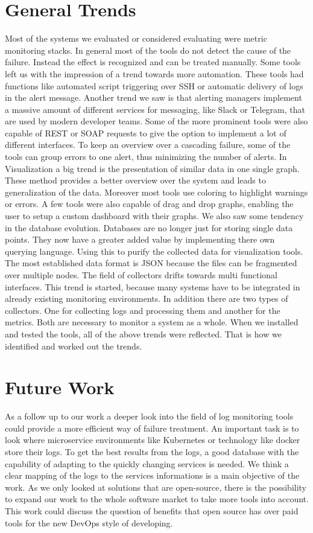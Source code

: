 \section{General Trends}
\label{generaltrends}
Most of the systems we evaluated or considered evaluating were metric monitoring stacks. In general most of the tools do not detect the cause of the failure. Instead the effect is recognized and can be treated manually. Some tools left us with the impression of a trend towards more automation. These tools had functions like automated script triggering over SSH or automatic delivery of logs in the alert message. 
Another trend we saw is that alerting managers implement a massive amount of different services for messaging, like Slack or Telegram, that are used by modern developer teams. Some of the more prominent tools were also capable of REST or SOAP requests to give the option to implement a lot of different interfaces. To keep an overview over a cascading failure, some of the tools can group errors to one alert, thus minimizing the number of alerts.
In Visualization a big trend is the presentation of similar data in one single graph. These method provides a better overview over the system and leads to generalization of the data. Moreover most tools use coloring to highlight warnings or errors. A few tools were also capable of drag and drop graphs, enabling the user to setup a custom dashboard with their graphs.
We also saw some tendency in the database evolution. Databases are no longer just for storing single data points. They now have a greater added value by implementing there own querying language. Using this to purify the collected data for visualization tools. The most established data format is JSON because the files can be fragmented over multiple nodes.
The field of collectors drifts towards multi functional interfaces. This trend is started, because many systems have to be integrated in already existing monitoring environments. In addition there are two types of collectors. One for collecting logs and processing them and another for the metrics. Both are necessary to monitor a system as a whole.
When we installed and tested the tools, all of the above trends were reflected. That is how we identified and worked out the trends. 

\section{Future Work}
\label{futurework}
As a follow up to our work a deeper look into the field of log monitoring tools could provide a more efficient way of failure treatment. An important task is to look where microservice environments like Kubernetes or technology like docker store their logs. To get the best results from the logs, a good database with the capability of adapting to the quickly changing services is needed. We think a clear mapping of the logs to the services informations is a main objective of the work.
As we only looked at solutions that are open-source, there is the possibility to expand our work to the whole software market to take more tools into account. This work could discuss the question of benefits that open source has over paid tools for the new DevOps style of developing.

